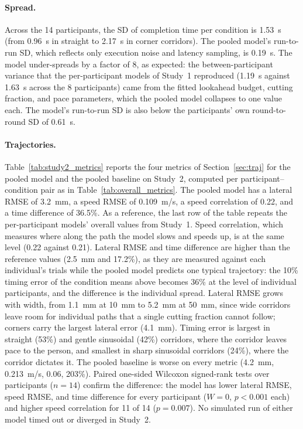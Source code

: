 \paragraph{Spread.}
Across the 14 participants, the SD of completion time per condition is
1.53~s (from 0.96~s in straight to 2.17~s in corner corridors). The pooled
model's run-to-run SD, which reflects only execution noise and latency
sampling, is 0.19~s. The model under-spreads by a factor of 8, as expected:
the between-participant variance that the per-participant models of
Study~1 reproduced (1.19~s against 1.63~s across the 8 participants) came
from the fitted lookahead budget, cutting fraction, and pace parameters,
which the pooled model collapses to one value each. The model's run-to-run
SD is also below the participants' own round-to-round SD of 0.61~s.

\paragraph{Trajectories.}
Table~\ref{tab:study2_metrics} reports the four metrics of
Section~\ref{sec:traj} for the pooled model and the pooled baseline on
Study~2, computed per participant--condition pair as in
Table~\ref{tab:overall_metrics}. The pooled model has a lateral RMSE of
3.2~mm, a speed RMSE of 0.109~m/s, a speed correlation of 0.22, and a
time difference of 36.5\%. As a reference, the last row of the table
repeats the per-participant models' overall values from Study~1. Speed
correlation, which measures where along the path the model slows and
speeds up, is at the same level (0.22 against 0.21). Lateral RMSE and
time difference are higher than the reference values (2.5~mm and 17.2\%),
as they are measured against each individual's trials while the pooled
model predicts one typical trajectory: the 10\% timing error of the
condition means above becomes 36\% at the level of individual
participants, and the difference is the individual spread. Lateral RMSE
grows with width, from 1.1~mm at 10~mm to 5.2~mm at 50~mm, since wide
corridors leave room for individual paths that a single cutting fraction
cannot follow; corners carry the largest lateral error (4.1~mm). Timing
error is largest in straight (53\%) and gentle sinusoidal (42\%)
corridors, where the corridor leaves pace to the person, and smallest in
sharp sinusoidal corridors (24\%), where the corridor dictates it. The
pooled baseline is worse on every metric (4.2~mm, 0.213~m/s, 0.06,
203\%). Paired one-sided Wilcoxon signed-rank tests over participants
($n = 14$) confirm the difference: the model has lower lateral RMSE, speed
RMSE, and time difference for every participant ($W = 0$, $p < 0.001$
each) and higher speed correlation for 11 of 14 ($p = 0.007$). No
simulated run of either model timed out or diverged in Study~2.

